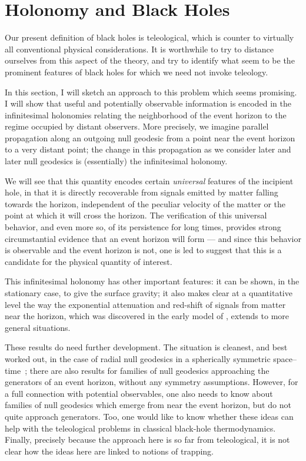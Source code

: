 \documentclass[12pt]{article}
\begin{document}
\section{Holonomy and Black Holes}

Our present definition of black holes is teleological, which is counter to virtually all conventional physical considerations.  It is worthwhile to try to distance ourselves from this aspect of the theory, and try to identify what seem to be the prominent features of black holes for which we need not invoke teleology.  

In this section, I will sketch an approach to this problem which seems promising.  I will show that useful and potentially observable information is encoded in the infinitesimal holonomies relating the neighborhood of the event horizon to the regime occupied by distant observers.  More precisely, we imagine parallel propagation along an outgoing null geodesic from a point near the event horizon to a very distant point; the change in this propagation as we consider later and later null geodesics is (essentially) the infinitesimal holonomy.  

We will see that this quantity encodes certain {\em universal} features of the incipient hole, in that it is directly recoverable from signals emitted by matter falling towards the horizon, independent of the peculiar velocity of the matter or the point at which it will cross the horizon.  The verification of this universal behavior, and even more so, of its persistence for long times, provides strong circumstantial evidence that an event horizon will form --- and since this behavior is observable and the event horizon is not, one is led to suggest that this is a candidate for the physical quantity of interest.  

This infinitesimal holonomy has other important features:  it can be shown, in the stationary case, to give the surface gravity; it also makes clear at a quantitative level the way the exponential attenuation and red-shift of signals from matter near the horizon, which was discovered in the early model of \citet{Oppenheimer:1939ue}, extends to more general situations.

These results do need further development.  The situation is cleanest, and best worked out, in the case of radial null geodesics in a spherically symmetric space--time~\citep{Helfer:2001}; there are also results for families of null geodesics approaching the generators of an event horizon, without any symmetry assumptions.  However, for a full connection with potential observables, one also needs to know about families of null geodesics which emerge from near the event horizon, but do not quite approach generators.
Too, one would like to know whether these ideas can help with the teleological problems in classical black-hole thermodynamics.  Finally, precisely because the approach here is so far from teleological, it is not clear how the ideas here are linked to notions of trapping.
\end{document}
